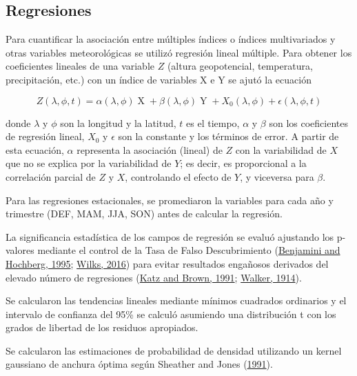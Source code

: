 \documentclass[12pt,oneside,a4paper]{reedthesis}
\begin{document}
\hypertarget{regresiones}{%
\subsection{Regresiones}\label{regresiones}}

Para cuantificar la asociación entre múltiples índices o índices multivariados y otras variables meteorológicas se utilizó regresión lineal múltiple.
Para obtener los coeficientes lineales de una variable \(Z\) (altura geopotencial, temperatura, precipitación, etc.) con un índice de variables X e Y se ajutó la ecuación

\begin{equation}
Z(\lambda, \phi, t) = \alpha(\lambda, \phi) \operatorname{X} + \beta(\lambda, \phi) \operatorname{Y} + X_0(\lambda, \phi) + \epsilon(\lambda, \phi, t)
\label{eq:multiple-regression-sam}
\end{equation}

donde \(\lambda\) y \(\phi\) son la longitud y la latitud, \(t\) es el tiempo, \(\alpha\) y \(\beta\) son los coeficientes de regresión lineal, \(X_0\) y \(\epsilon\) son la constante y los términos de error.
A partir de esta ecuación, \(\alpha\) representa la asociación (lineal) de \(Z\) con la variabilidad de \(X\) que no se explica por la variabilidad de \(Y\); es decir, es proporcional a la correlación parcial de \(Z\) y \(X\), controlando el efecto de \(Y\), y viceversa para \(\beta\).

Para las regresiones estacionales, se promediaron la variables para cada año y trimestre (DEF, MAM, JJA, SON) antes de calcular la regresión.

La significancia estadística de los campos de regresión se evaluó ajustando los p-valores mediante el control de la Tasa de Falso Descubrimiento (\protect\hyperlink{ref-benjamini1995}{Benjamini and Hochberg, 1995}; \protect\hyperlink{ref-wilks2016}{Wilks, 2016}) para evitar resultados engañosos derivados del elevado número de regresiones (\protect\hyperlink{ref-katz1991}{Katz and Brown, 1991}; \protect\hyperlink{ref-walker1914}{Walker, 1914}).

Se calcularon las tendencias lineales mediante mínimos cuadrados ordinarios y el intervalo de confianza del 95\% se calculó asumiendo una distribución t con los grados de libertad de los residuos apropiados.

Se calcularon las estimaciones de probabilidad de densidad utilizando un kernel gaussiano de anchura óptima según Sheather and Jones (\protect\hyperlink{ref-sheather1991}{1991}).
\end{document}
